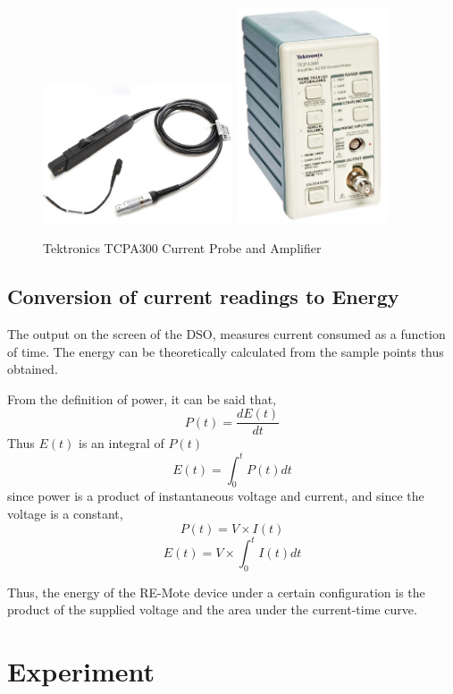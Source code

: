 \documentclass[a4paper]{article}
\begin{document}
\begin{figure}
\includegraphics[width=0.5\textwidth]{images/current-probe.pdf}
\includegraphics[width=0.4\textwidth]{images/current-amp.pdf}
\caption{\label{fig:probe}Tektronics TCPA300 Current Probe and Amplifier}
\end{figure}

\subsection{Conversion of current readings to Energy}
The output on the screen of the DSO, measures current consumed as a function of time. The energy can be theoretically calculated from the sample points thus obtained.\par
From the definition of power, it can be said that,
$$ P(t) = \frac{dE(t)}{dt} $$
Thus $E(t)$ is an integral of $P(t)$
$$ E(t) = \int_{0}^{t}P(t)dt $$
since power is a product of instantaneous voltage and current, and since the voltage is a constant,
$$ P(t) = V \times I(t) $$
$$ E(t) = V \times \int_{0}^{t}I(t)dt $$

Thus, the energy of the RE-Mote device under a certain configuration is the product of the supplied voltage and the area under the current-time curve.

\section{Experiment}
\end{document}
